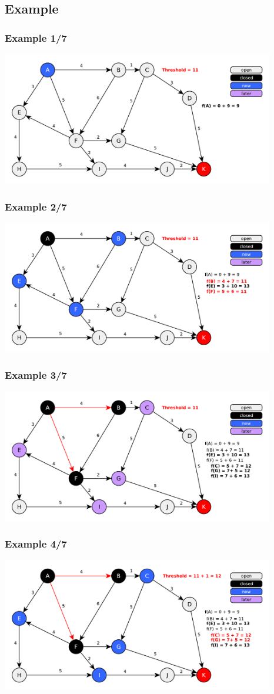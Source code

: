 \documentclass{beamer}
\begin{document}

\subsection{Example}

\begin{frame}
\frametitle{Example 1/7}
\includegraphics[height=165pt]{fringe1.pdf}
\end{frame}
\begin{frame}
\frametitle{Example 2/7}
\includegraphics[height=165pt]{fringe2.pdf}
\end{frame}
\begin{frame}
\frametitle{Example 3/7}
\includegraphics[height=165pt]{fringe3.pdf}
\end{frame}
\begin{frame}
\frametitle{Example 4/7}
\includegraphics[height=165pt]{fringe4.pdf}
\end{frame}
\end{document}
